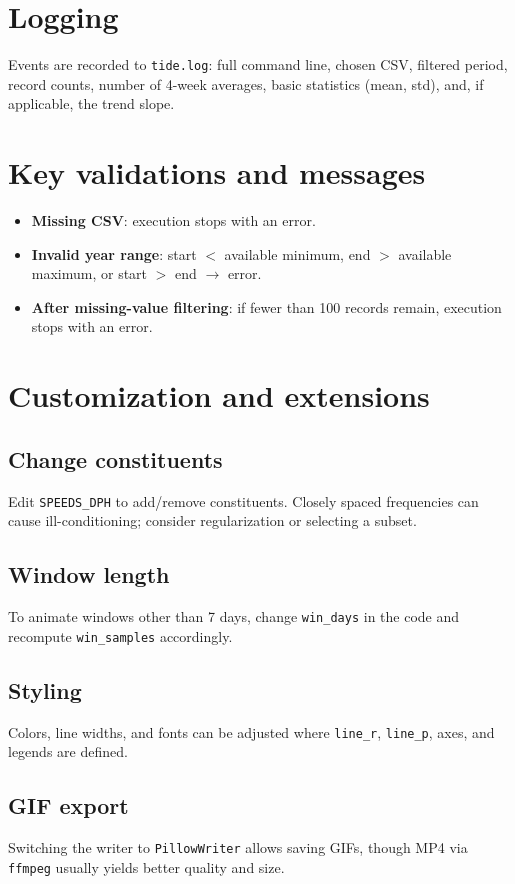 \documentclass[11pt,a4paper]{article}
\begin{document}
\section{Logging}
Events are recorded to \texttt{tide.log}: full command line, chosen CSV, filtered period, record counts, number of 4-week averages, basic statistics (mean, std), and, if applicable, the trend slope.

\section{Key validations and messages}
\begin{itemize}[leftmargin=1.5em]
  \item \textbf{Missing CSV}: execution stops with an error.
  \item \textbf{Invalid year range}: start $<$ available minimum, end $>$ available maximum, or start $>$ end $\rightarrow$ error.
  \item \textbf{After missing-value filtering}: if fewer than 100 records remain, execution stops with an error.
\end{itemize}

\section{Customization and extensions}
\subsection{Change constituents}
Edit \texttt{SPEEDS\_DPH} to add/remove constituents. Closely spaced frequencies can cause ill-conditioning; consider regularization or selecting a subset.

\subsection{Window length}
To animate windows other than 7 days, change \texttt{win\_days} in the code and recompute \texttt{win\_samples} accordingly.

\subsection{Styling}
Colors, line widths, and fonts can be adjusted where \texttt{line\_r}, \texttt{line\_p}, axes, and legends are defined.

\subsection{GIF export}
Switching the writer to \texttt{PillowWriter} allows saving GIFs, though MP4 via \texttt{ffmpeg} usually yields better quality and size.
\end{document}
